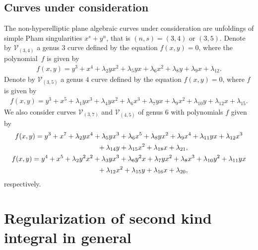 \subsection{Curves under consideration}
The non-hyperelliptic plane algebraic curves under consideration are unfoldings of simple Pham singularities $x^s + y^n$, that is $(n,s)=(3,4)$ or $(3,5)$. Denote by $\mathcal{V}_{(3,4)}$ a genus $3$ curve defined by the equation $f(x,y)=0$, where the polynomial~$f$ is given by
\begin{gather}\label{C34eq}
f(x,y) = y^3 + x^4 + \lambda_2 y x^2 + \lambda_5 y x + \lambda_6 x^2 + \lambda_8 y + \lambda_9 x + \lambda_{12}.
\end{gather}
Denote by $\mathcal{V}_{(3,5)}$ a genus $4$ curve defined by the equation $f(x,y)=0$, where
$f$ is given by
\begin{gather}\label{C35eq}
 f(x,y) = y^3 + x^5 + \lambda_1 y x^3 + \lambda_4 y x^2 + \lambda_6 x^3 + \lambda_7 y x + \lambda_9 x^2 + \lambda_{10} y + \lambda_{12} x + \lambda_{15}.
\end{gather}
We also consider curves $\mathcal{V}_{(3,7)}$ and $\mathcal{V}_{(4,5)}$ of genus 6 with polynomials $f$ given by
\begin{gather*}
f(x,y) = y^3 + x^7 + \lambda_2 y x^4 + \lambda_5 y x^3 + \lambda_6 x^5 + \lambda_8 y x^2 + \lambda_9 x^4 + \lambda_{11} y x + \lambda_{12} x^3 \\
\hphantom{f(x,y) =}{} + \lambda_{14} y + \lambda_{15} x^2 + \lambda_{18} x + \lambda_{21},\\
f(x,y) = y^4 + x^5 + \lambda_2 y^2 x^2 + \lambda_3 y x^3 +\lambda_6 y^2 x+\lambda_7 y x^2 + \lambda_8 x^3 +\lambda_{10} y^2 +\lambda_{11} y x \\
\hphantom{f(x,y) =}{} + \lambda_{12} x^2 + \lambda_{15} y + \lambda_{16} x + \lambda_{20},
\end{gather*}
respectively.

\section{Regularization of second kind integral in general}\label{s:RegInt}

